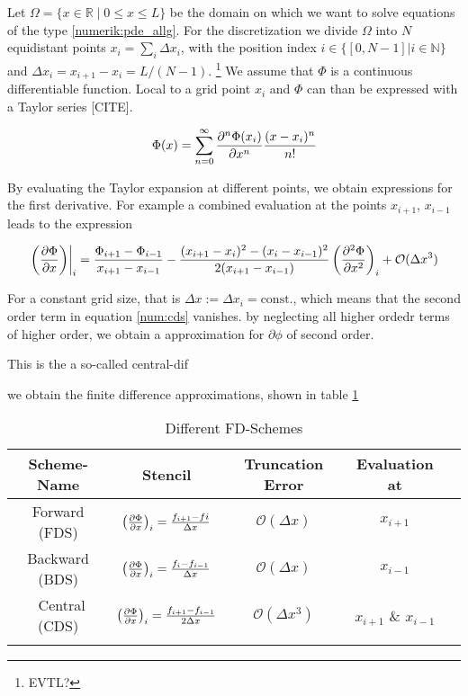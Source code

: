 Let $\Omega = \{x \in \mathbb{R} \;|\; 0 \leq x \leq L\}$ be the domain on which we want to solve equations of the type \ref{numerik:pde_allg}.
For the discretization we divide $\Omega$ into $N$ equidistant points $x_i = \sum_i \Delta x_i$, with the position index ${i\in\{[0, N-1]|i\in\mathbb{N}\}}$
and $\Delta x_i = x_{i+1} - x_i = L/(N-1)$.
\footnote{EVTL?}
We assume that $\Phi$ is a  continuous differentiable function.
Local to a grid point $x_i$ and $\Phi$ can than be expressed with a Taylor series [CITE].

\begin{align}
    \Phi(x) = \sum_{n=0}^{\infty} \pdn[^n\Phi(x_i)]{x^n} \frac{(x - x_i)^n}{n!}
\end{align}

By evaluating the Taylor expansion at different points, we obtain expressions for the first derivative. For example
a combined evaluation at the points $x_{i+1}$, $x_{i-1}$ leads to the expression

\begin{align}
    \label{num:cds}
    \left.\left(\pdn[\Phi]{x}\right)\right|_{i} = \frac{\Phi_{i+1} - \Phi_{i-1}}{x_{i+1} - x_{i-1}}
     - \frac{(x_{i+1} - x_i)^2 - (x_i - x_{i-1})^2}{2 (x_{i+1} - x_{i-1})}\left(\pdn[^2\Phi]{x^2}\right)_i + \mathcal{O}(\Delta x^3)
\end{align}

For a constant grid size, that is $\Delta x := \Delta x_i = \text{const.}$, which means that the second order term in equation \ref{num:cds} vanishes.
by neglecting all higher ordedr terms of higher order, we obtain a approximation for $\partial \phi$ of second order.

This is the a so-called central-dif


we obtain the finite difference approximations, shown in table \ref{num:df_table}

\bgroup\large
\begin{table}[!btp]
\centering
\def\arraystretch{1.6}%
\begin{tabular}{c c c c c}\toprule
Scheme-Name & Stencil & Truncation Error & Evaluation at\\[0.5ex]
\midrule
Forward  (FDS) & $\left(\pdn[\Phi]{x}\right)_i =  \frac{f_{i+1} - f{i}}   {\Delta x}$ & $\mathcal{O}(\Delta x)$  &$x_{i+1}$\\
Backward (BDS) & $\left(\pdn[\Phi]{x}\right)_i = \frac{f_{i}    - f_{i-1}}{\Delta x}$  &$ \mathcal{O}(\Delta x)$ & $x_{i-1}$\\\
Central  (CDS) & $\left(\pdn[\Phi]{x}\right)_i = \frac{f_{i+1}  - f_{i-1}}{2\Delta x}$ &$ \mathcal{O}(\Delta x^3)$& $x_{i+1}$ \& $x_{i-1}$\\
\\
\bottomrule
\end{tabular}
\label{num:df_table}
\caption{Different FD-Schemes}
\end{table}
\egroup


